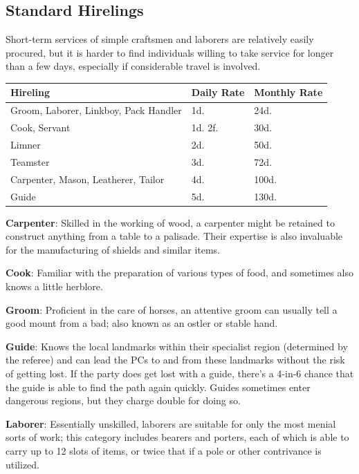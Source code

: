 \documentclass{book}
\begin{document}
\subsection*{Standard Hirelings}\label{standard-hirelings}

Short-term services of simple craftsmen and laborers are relatively
easily procured, but it is harder to find individuals willing to take
service for longer than a few days, especially if considerable travel is
involved.

\begin{longtable}[]{@{}lll@{}}
\toprule\noalign{}
Hireling & Daily Rate & Monthly Rate \\
\midrule\noalign{}
\endhead
\bottomrule\noalign{}
\endlastfoot
Groom, Laborer, Linkboy, Pack Handler & 1d. & 24d. \\
Cook, Servant & 1d. 2f. & 30d. \\
Limner & 2d. & 50d. \\
Teamster & 3d. & 72d. \\
Carpenter, Mason, Leatherer, Tailor & 4d. & 100d. \\
Guide & 5d. & 130d. \\
\end{longtable}

\textbf{Carpenter}: Skilled in the working of wood, a carpenter might be
retained to construct anything from a table to a palisade. Their
expertise is also invaluable for the manufacturing of shields and
similar items.

\textbf{Cook}: Familiar with the preparation of various types of food,
and sometimes also knows a little herblore.

\textbf{Groom}: Proficient in the care of horses, an attentive groom can
usually tell a good mount from a bad; also known as an ostler or stable
hand.

\textbf{Guide}: Knows the local landmarks within their specialist region
(determined by the referee) and can lead the PCs to and from these
landmarks without the risk of getting lost. If the party does get lost
with a guide, there's a 4-in-6 chance that the guide is able to find the
path again quickly. Guides sometimes enter dangerous regions, but they
charge double for doing so.

\textbf{Laborer}: Essentially unskilled, laborers are suitable for only
the most menial sorts of work; this category includes bearers and
porters, each of which is able to carry up to 12 slots of items, or
twice that if a pole or other contrivance is utilized.
\end{document}
